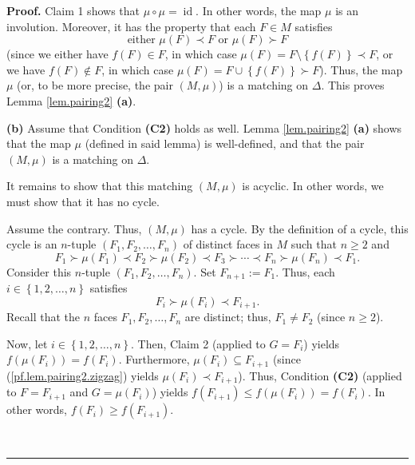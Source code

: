 \documentclass[numbers=enddot,12pt,final,onecolumn,notitlepage]{scrartcl}%
\theoremstyle{definition}
\newenvironment{proof}[1][Proof]{\noindent\textbf{#1.} }{\ \rule{0.5em}{0.5em}}
\begin{document}
\begin{proof}
Claim 1 shows that $\mu\circ\mu=\operatorname*{id}$. In other words, the map
$\mu$ is an involution. Moreover, it has the property that each $F\in M$
satisfies%
\[
\text{either }\mu\left(  F\right)  \prec F\text{ or }\mu\left(  F\right)
\succ F
\]
(since we either have $f\left(  F\right)  \in F$, in which case $\mu\left(
F\right)  =F\setminus\left\{  f\left(  F\right)  \right\}  \prec F$, or we
have $f\left(  F\right)  \notin F$, in which case $\mu\left(  F\right)
=F\cup\left\{  f\left(  F\right)  \right\}  \succ F$). Thus, the map $\mu$
(or, to be more precise, the pair $\left(  M,\mu\right)  $) is a matching on
$\Delta$. This proves Lemma \ref{lem.pairing2} \textbf{(a)}. \medskip

\textbf{(b)} Assume that Condition \textbf{(C2)} holds as well. Lemma
\ref{lem.pairing2} \textbf{(a)} shows that the map $\mu$ (defined in said
lemma) is well-defined, and that the pair $\left( M, \mu\right) $ is a
matching on $\Delta$.

It remains to show that this matching $\left(  M,\mu\right)  $ is acyclic. In
other words, we must show that it has no cycle.

Assume the contrary. Thus, $\left(  M,\mu\right)  $ has a cycle. By the
definition of a cycle, this cycle is an $n$-tuple $\left(  F_{1},F_{2}%
,\ldots,F_{n}\right)  $ of distinct faces in $M$ such that $n\geq2$ and%
\[
F_{1}\succ\mu\left(  F_{1}\right)  \prec F_{2}\succ\mu\left(  F_{2}\right)
\prec F_{3}\succ\cdots\prec F_{n}\succ\mu\left(  F_{n}\right)  \prec F_{1}.
\]
Consider this $n$-tuple $\left(  F_{1},F_{2},\ldots,F_{n}\right)  $. Set
$F_{n+1}:=F_{1}$. Thus, each $i\in\left\{  1,2,\ldots,n\right\}  $ satisfies
\begin{equation}
F_{i}\succ\mu\left(  F_{i}\right)  \prec F_{i+1}.
\label{pf.lem.pairing2.zigzag}%
\end{equation}
Recall that the $n$ faces $F_{1},F_{2},\ldots,F_{n}$ are distinct; thus,
$F_{1}\neq F_{2}$ (since $n\geq2$).

Now, let $i\in\left\{  1,2,\ldots,n\right\}  $. Then, Claim 2 (applied to
$G=F_{i}$) yields $f\left(  \mu\left(  F_{i}\right)  \right)  =f\left(
F_{i}\right)  $. Furthermore, $\mu\left(  F_{i}\right)  \subseteq F_{i+1}$
(since (\ref{pf.lem.pairing2.zigzag}) yields $\mu\left(  F_{i}\right)  \prec
F_{i+1}$). Thus, Condition \textbf{(C2)} (applied to $F=F_{i+1}$ and
$G=\mu\left(  F_{i}\right)  $) yields $f\left(  F_{i+1}\right)  \leq f\left(
\mu\left(  F_{i}\right)  \right)  =f\left(  F_{i}\right)  $. In other words,
$f\left(  F_{i}\right)  \geq f\left(  F_{i+1}\right)  $.


\end{proof}
\end{document}
